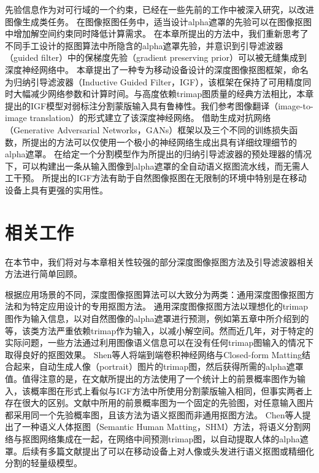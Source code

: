 先验信息作为对可行域的一个约束，已经在一些先前的工作中被深入研究，以改进图像生成类任务\cite{ulyanov2018deep}。
在图像抠图任务中，适当设计alpha遮罩的先验可以在图像抠图中增加解空间约束同时降低计算需求。
在本章所提出的方法中，我们重新思考了不同手工设计的抠图算法中所隐含的alpha遮罩先验，并意识到引导滤波器（guided filter）\cite{he2010guided}中的保梯度先验（gradient preserving prior）可以被无缝集成到深度神经网络中。
本章提出了一种专为移动设备设计的深度图像抠图框架，命名为归纳引导滤波器（Inductive Guided Filter，IGF），该框架在保持了可用精度同时大幅减少网络参数和计算时间。与高度依赖trimap图质量的经典方法相比，本章提出的IGF模型对弱标注分割蒙版输入具有鲁棒性。我们参考图像翻译（image-to-image translation）的形式建立了该深度神经网络。
借助生成对抗网络（Generative Adversarial Networks，GANs）框架以及三个不同的训练损失函数，所提出的方法可以仅使用一个极小的神经网络生成出具有详细纹理细节的alpha遮罩。
在给定一个分割模型作为所提出的归纳引导滤波器的预处理器的情况下，可以构建出一条从输入图像到alpha遮罩的全自动语义抠图流水线，而无需人工干预。
所提出的IGF方法有助于自然图像抠图在无限制的环境中特别是在移动设备上具有更强的实用性。

\section{相关工作}
在本节中，我们将对与本章相关性较强的部分深度图像抠图方法及引导滤波器相关方法进行简单回顾。

根据应用场景的不同，深度图像抠图算法可以大致分为两类：通用深度图像抠图方法和为特定应用设计的专用抠图方法。
通用深度图像抠图方法以理想化的trimap图作为输入信息，以对自然图像的alpha遮罩进行预测，例如第五章中所介绍到的\parencite{cho2019deep,xu2017deep,lutz2018alphagan,cai2019disentangled,lu2019indices,hou2019context,samplenet}等，该类方法严重依赖trimap作为输入，以减小解空间。然而近几年，对于特定的实际问题，一些方法通过利用图像语义信息可以在没有任何trimap图输入的情况下取得良好的抠图效果。
Shen等人\cite{shen2016deep}将端到端卷积神经网络与Closed-form Matting\cite{levin2008closed}结合起来，自动生成人像（portrait）图片的trimap图，然后获得所需的alpha遮罩值。值得注意的是，在文献\parencite{shen2016deep}所提出的方法使用了一个统计上的前景概率图作为输入，该概率图在形式上看似与IGF方法中所使用分割蒙版输入相同，但事实两者上存在很大的区别。文献\parencite{shen2016deep}中所用的前景概率图为一个固定的先验图，对任意输入图片都采用同一个先验概率图，且该方法为语义抠图而非通用抠图方法。
Chen等人\cite{chen2018semantic}提出了一种语义人体抠图（Semantic Human Matting，SHM）方法，将语义分割网络与抠图网络集成在一起，在网络中间预测trimap图，以自动提取人体的alpha遮罩。后续有多篇文献\cite{zhu2017fast,levinshtein2018real,chen2019boundary}提出了可以在移动设备上对人像或头发进行语义抠图或精细化分割的轻量级模型。

